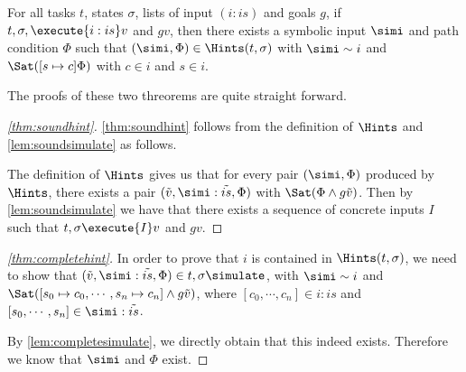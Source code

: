 \begin{theorem}
  \label{thm:completehint}
  For all tasks $t$, states $\sigma$, lists of input $(i:is)$ and goals $g$,
  if $t,\sigma,\execute{i:is} v$ and $g v$, then there exists a symbolic input $\simi$ and path condition $\Phi$
  such that $(\simi,\Phi)\in\Hints(t,\sigma)$ with $\simi\sim i$ and $\Sat([s\mapsto c]\Phi)$ with $c\in i$ and $s\in i$.
\end{theorem}


The proofs of these two threorems are quite straight forward.

\begin{proof}[\cref{thm:soundhint}]
  \cref{thm:soundhint} follows from the definition of $\Hints$ and \cref{lem:soundsimulate} as follows.

  The definition of $\Hints$ gives us that for every pair $(\simi,\Phi)$ produced by $\Hints$,
  there exists a pair $(\tilde{v},\simi:\tilde{is},\Phi)$ with $\Sat(\Phi\land g \tilde{v})$.
  Then by \cref{lem:soundsimulate} we have that there exists a sequence of concrete inputs $I$ such that
  $t,\sigma\execute{I}v$ and $g v$.
\end{proof}


\begin{proof}[\cref{thm:completehint}]
  In order to prove that $i$ is contained in $\Hints(t,\sigma)$, we need to show that $(\tilde{v},\simi:\tilde{is},\Phi)\in t,\sigma\simulate$, with $\simi\sim i$ and $\Sat([s_0\mapsto c_0,\cdots,s_n\mapsto c_n]\land g\tilde{v})$, where $[c_0,\cdots,c_n]\in i:is$ and $[s_0,\cdots,s_n]\in \simi:\tilde{is}$.

  By \cref{lem:completesimulate}, we directly obtain that this indeed exists. Therefore we know that $\simi$ and $\Phi$ exist.
\end{proof}
